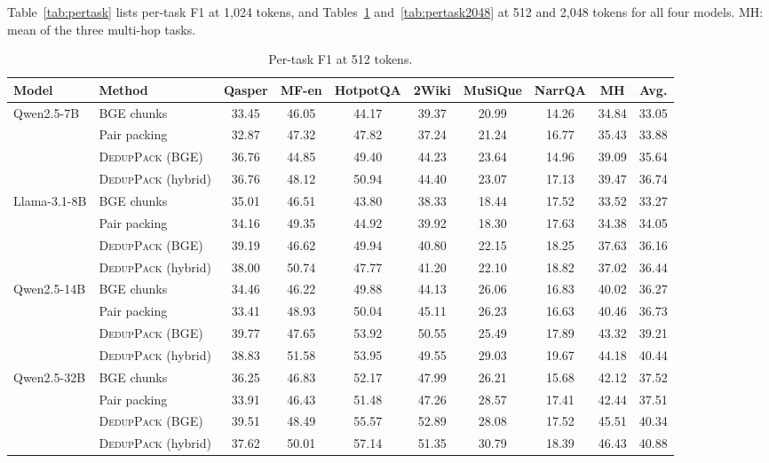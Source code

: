 \documentclass[11pt]{article}
\newcommand{\spk}{\textsc{DedupPack}}
\begin{document}
Table~\ref{tab:pertask} lists per-task F1 at 1,024 tokens, and Tables~\ref{tab:pertask512} and~\ref{tab:pertask2048} at 512 and 2,048 tokens for all four models. MH: mean of the three multi-hop tasks.

\begin{table}[t]
\centering
\small
\setlength{\tabcolsep}{4pt}
\begin{tabular}{llcccccc|cc}
\toprule
Model & Method & Qasper & MF-en & HotpotQA & 2Wiki & MuSiQue & NarrQA & MH & Avg. \\
\midrule
\multirow{4}{*}{Qwen2.5-7B}
 & BGE chunks & 33.45 & 46.05 & 44.17 & 39.37 & 20.99 & 14.26 & 34.84 & 33.05 \\
 & Pair packing & 32.87 & 47.32 & 47.82 & 37.24 & 21.24 & 16.77 & 35.43 & 33.88 \\
 & \spk{} (BGE) & 36.76 & 44.85 & 49.40 & 44.23 & 23.64 & 14.96 & 39.09 & 35.64 \\
 & \spk{} (hybrid) & 36.76 & 48.12 & 50.94 & 44.40 & 23.07 & 17.13 & 39.47 & 36.74 \\
\midrule
\multirow{4}{*}{Llama-3.1-8B}
 & BGE chunks & 35.01 & 46.51 & 43.80 & 38.33 & 18.44 & 17.52 & 33.52 & 33.27 \\
 & Pair packing & 34.16 & 49.35 & 44.92 & 39.92 & 18.30 & 17.63 & 34.38 & 34.05 \\
 & \spk{} (BGE) & 39.19 & 46.62 & 49.94 & 40.80 & 22.15 & 18.25 & 37.63 & 36.16 \\
 & \spk{} (hybrid) & 38.00 & 50.74 & 47.77 & 41.20 & 22.10 & 18.82 & 37.02 & 36.44 \\
\midrule
\multirow{4}{*}{Qwen2.5-14B}
 & BGE chunks & 34.46 & 46.22 & 49.88 & 44.13 & 26.06 & 16.83 & 40.02 & 36.27 \\
 & Pair packing & 33.41 & 48.93 & 50.04 & 45.11 & 26.23 & 16.63 & 40.46 & 36.73 \\
 & \spk{} (BGE) & 39.77 & 47.65 & 53.92 & 50.55 & 25.49 & 17.89 & 43.32 & 39.21 \\
 & \spk{} (hybrid) & 38.83 & 51.58 & 53.95 & 49.55 & 29.03 & 19.67 & 44.18 & 40.44 \\
\midrule
\multirow{4}{*}{Qwen2.5-32B}
 & BGE chunks & 36.25 & 46.83 & 52.17 & 47.99 & 26.21 & 15.68 & 42.12 & 37.52 \\
 & Pair packing & 33.91 & 46.43 & 51.48 & 47.26 & 28.57 & 17.41 & 42.44 & 37.51 \\
 & \spk{} (BGE) & 39.51 & 48.49 & 55.57 & 52.89 & 28.08 & 17.52 & 45.51 & 40.34 \\
 & \spk{} (hybrid) & 37.62 & 50.01 & 57.14 & 51.35 & 30.79 & 18.39 & 46.43 & 40.88 \\
\bottomrule
\end{tabular}
\caption{Per-task F1 at 512 tokens.}
\label{tab:pertask512}
\end{table}
\end{document}
